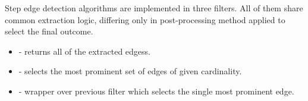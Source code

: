 \begin{refImpl}
Step edge detection algorithms are implemented in three \studio filters. All of them share common extraction logic, differing only in post-processing method applied to select the final outcome.
\begin{itemize}
	\item {} - returns all of the extracted edgess.
	\item {} - selects the most prominent set of edges of given cardinality.
	\item {} - wrapper over previous filter which selects the single most prominent edge.
\end{itemize} 
\end{refImpl}

